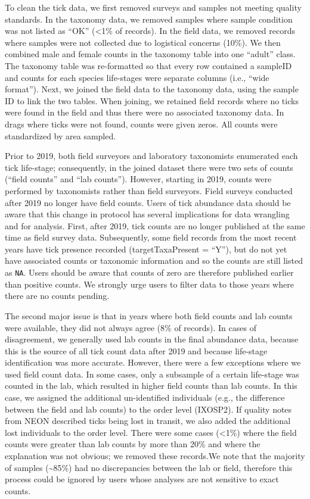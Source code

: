 \documentclass[
  12pt,
]{article}
\begin{document}
To clean the tick data, we first removed surveys and samples not meeting quality standards. In the taxonomy data, we removed samples where sample condition was not listed as ``OK'' (\textless1\% of records). In the field data, we removed records where samples were not collected due to logistical concerns (10\%). We then combined male and female counts in the taxonomy table into one ``adult'' class. The taxonomy table was re-formatted so that every row contained a sampleID and counts for each species life-stages were separate columns (i.e., ``wide format''). Next, we joined the field data to the taxonomy data, using the sample ID to link the two tables. When joining, we retained field records where no ticks were found in the field and thus there were no associated taxonomy data. In drags where ticks were not found, counts were given zeros. All counts were standardized by area sampled.

Prior to 2019, both field surveyors and laboratory taxonomists enumerated each tick life-stage; consequently, in the joined dataset there were two sets of counts (``field counts'' and ``lab counts''). However, starting in 2019, counts were performed by taxonomists rather than field surveyors. Field surveys conducted after 2019 no longer have field counts. Users of tick abundance data should be aware that this change in protocol has several implications for data wrangling and for analysis. First, after 2019, tick counts are no longer published at the same time as field survey data. Subsequently, some field records from the most recent years have tick presence recorded (targetTaxaPresent = ``Y''), but do not yet have associated counts or taxonomic information and so the counts are still listed as \texttt{NA}. Users should be aware that counts of zero are therefore published earlier than positive counts. We strongly urge users to filter data to those years where there are no counts pending.

The second major issue is that in years where both field counts and lab counts were available, they did not always agree (8\% of records). In cases of disagreement, we generally used lab counts in the final abundance data, because this is the source of all tick count data after 2019 and because life-stage identification was more accurate. However, there were a few exceptions where we used field count data. In some cases, only a subsample of a certain life-stage was counted in the lab, which resulted in higher field counts than lab counts. In this case, we assigned the additional un-identified individuals (e.g., the difference between the field and lab counts) to the order level (IXOSP2). If quality notes from NEON described ticks being lost in transit, we also added the additional lost individuals to the order level. There were some cases (\textless1\%) where the field counts were greater than lab counts by more than 20\% and where the explanation was not obvious; we removed these records.We note that the majority of samples (\textasciitilde85\%) had no discrepancies between the lab or field, therefore this process could be ignored by users whose analyses are not sensitive to exact counts.
\end{document}
